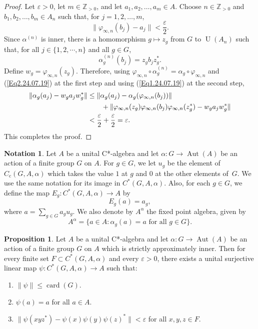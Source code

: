 \documentclass[10pt]{amsart}
\newcounter{TmpEnumi}
\numberwithin{equation}{section}
\theoremstyle{definition}
\newtheorem{prp}[thm]{Proposition}
\newtheorem{ntn}[thm]{Notation}
\newcommand{\af}{\alpha}
\newcommand{\ep}{\varepsilon}
\newcommand{\N}{{\mathbb{Z}}_{> 0}}
\newcommand{\card}{{\operatorname{card}}}
\newcommand{\Aut}{{\operatorname{Aut}}}
\newcommand{\U}{{\operatorname{U}}}
\newcommand{\ca}{C*-algebra}
\newcommand{\CGAa}{C^* (G, A, \af)}
\newcommand{\I}{\infty}
\begin{document}
\begin{proof}
Let $\ep > 0$, let $m \in \N$, and let $a_1, a_2, \ldots, a_m \in A$.
Choose $n \in \N$
and $b_1, b_2, \ldots, b_m \in A_n$
such that, for $j = 1, 2, \ldots, m$,
\begin{equation}\label{Eq1.24.07.19}
\| \varphi_{\infty, n} (b_j) - a_j \| < \frac{\ep}{2}.
\end{equation} 
Since $\alpha^{(n)}$ is inner,
there is a homomorphism $g \mapsto z_g$ from $G$ to  $\U (A_n)$ 
such that, for all $j\in \{ 1,2,\cdots, n\}$ and all $g \in G$,
\begin{equation}\label{Eq2.24.07.19}
\alpha^{(n)}_g (b_j) = z_g b_j z^*_g.
\end{equation}
Define $w_g = \varphi_{\I, n} (z_g)$. Therefore, 
using $\varphi_{\infty, n} \circ \alpha^{(n)}_g = \alpha_g \circ \varphi_{\infty, n}$ 
and (\ref{Eq2.24.07.19}) at the first  step and using (\ref{Eq1.24.07.19}) at the second step,
\begin{align*}
\| \alpha_g (a_j) - w_g a_j w^*_g\|
&\leq
\| \alpha_g (a_j) - \alpha_g (\varphi_{\infty, n} (b_j))\|
\\& \qquad +
\| \varphi_{\infty, n} (z_g) \varphi_{\infty, n} (b_j) \varphi_{\infty, n} (z^*_g)
-
w_g a_j w^*_g
 \|
\\\notag
&< \frac{\ep}{2} + \frac{\ep}{2} = \ep.
\end{align*}
This completes the proof.
\end{proof}
%
%
\begin{ntn}\label{N_9408_StdNotation_CP}
Let $A$ be a unital C*-algebra and let $\af \colon G \to \Aut (A)$ be an action
of a finite group $G$ on $A$. 
For $g \in G$,
we let $u_g$ be the element of $C_{\mathrm{c}} (G, A, \af)$
which takes the value $1$ at $g$
and $0$ at the other elements of~$G$.
We use the same notation for its image in $C^* (G, A, \af)$.
Also, for each $g \in G$, we define the map 
$ E_g \colon  \CGAa \to A$ by 
\[
E_g (a) = a_g,
\]
where $a= \sum_{g \in G} a_g u_g$.
We also denote by $A^{\alpha}$ the fixed
point algebra, given by
\[
A^{\alpha} = \big\{ a \in A \colon
\alpha_g (a) = a \mbox{ for all } g \in G \big\}.
\]
\end{ntn}
%
\begin{prp}\label{Prp_magic_a}
 Let $A$ be a unital \ca{} and let  $\alpha \colon  G \to \Aut(A)$ be an action of a 
finite  group $G$ on $A$ which is  strictly approximately inner. 
Then  for every finite
set $F \subset \CGAa$ and every $\ep > 0$, there exists a unital surjective linear map
$\psi \colon \CGAa \to A$ such that:
\begin{enumerate}
\item \label{Prp_magic_a.1}
$\| \psi \| \leq \card (G)$.
%
\item \label{Prp_magic_a.2}
$\psi (a) = a$ for all $a \in A$.
%
\item \label{Prp_magic_a.3}
$\| \psi (xy z^*) - \psi (x) \psi (y) \psi (z)^*\| < \ep$ for all $x, y, z \in F$.
%
\setcounter{TmpEnumi}{\value{enumi}}
\end{enumerate}
\end{prp}
\end{document}
